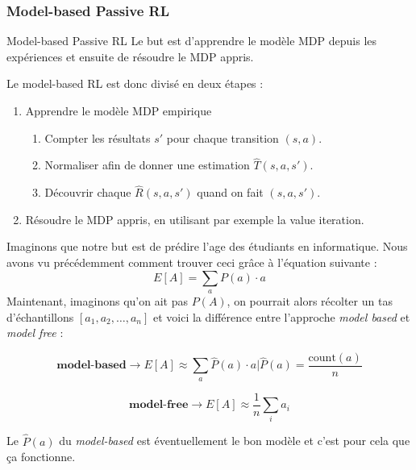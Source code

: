 \subsubsection{Model-based Passive RL} %
\label{ssub:model_based_passive_rl}
\begin{definition}{Model-based Passive RL}{}
    Le but est d'apprendre le modèle MDP depuis les expériences et ensuite de résoudre le MDP appris.
\end{definition}
Le model-based RL est donc divisé en deux étapes :
\begin{enumerate}
    \item Apprendre le modèle MDP empirique 
    \begin{enumerate}
        \item Compter les résultats $s'$ pour chaque transition $(s,a)$.
        \item Normaliser afin de donner une estimation $\hat{T}(s,a,s')$.
        \item Découvrir chaque $\hat{R}(s,a,s')$ quand on fait $(s,a,s')$.
    \end{enumerate}
    \item Résoudre le MDP appris, en utilisant par exemple la value iteration.
\end{enumerate}
\begin{example}
    Imaginons que notre but est de prédire l'age des étudiants en informatique. Nous avons vu précédemment comment trouver 
    ceci grâce à l'équation suivante :
    \begin{equation*}
        E[A] = \sum_{a}P(a)\cdot a
    \end{equation*}
    Maintenant, imaginons qu'on ait pas $P(A)$, on pourrait alors récolter un tas d'échantillons $[a_1,a_2,\dots,a_n]$ et
    voici la différence entre l'approche \textit{model based} et \textit{model free} :\\
    \noindent\begin{minipage}{.5\linewidth}
    \begin{equation*}
        \textbf{model-based}\rightarrow E[A] \approx \sum_{a} \hat{P}(a)\cdot a | \hat{P}(a) = \frac{\text{count}(a)}{n}
    \end{equation*}
    \end{minipage}
    \begin{minipage}{.5\linewidth}
        \begin{equation*}
            \textbf{model-free}\rightarrow E[A] \approx \frac{1}{n}\sum_{i}a_i
        \end{equation*}
    \end{minipage}
    Le $\hat{P}(a)$ du \textit{model-based} est éventuellement le bon modèle et c'est pour cela que ça fonctionne.
\end{example}

